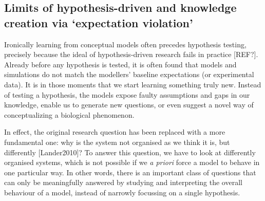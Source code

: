 \subsection{Limits of hypothesis-driven and knowledge creation via `expectation violation'}

Ironically learning from conceptual models often precedes hypothesis testing, precisely because the ideal of hypothesis-driven research fails in practice [REF?]. Already before any hypothesis is tested, it is often found that models and simulations do not match the modellers’ baseline expectations (or experimental data). It is in those moments that we start learning something truly new. Instead of testing a hypothesis, the models expose faulty assumptions and gaps in our knowledge, enable us to generate new questions, or even suggest a novel way of conceptualizing a biological phenomenon.

In effect, the original research question has been replaced with a more fundamental one: why is the system not organised as we think it is, but differently [Lander2010]? To answer this question, we have to look at differently organised systems, which is not possible if we \emph{a priori} force a model to behave in one particular way. In other words, there is an important class of questions that can only be meaningfully answered by studying and interpreting the overall behaviour of a model, instead of narrowly focussing on a single hypothesis.
